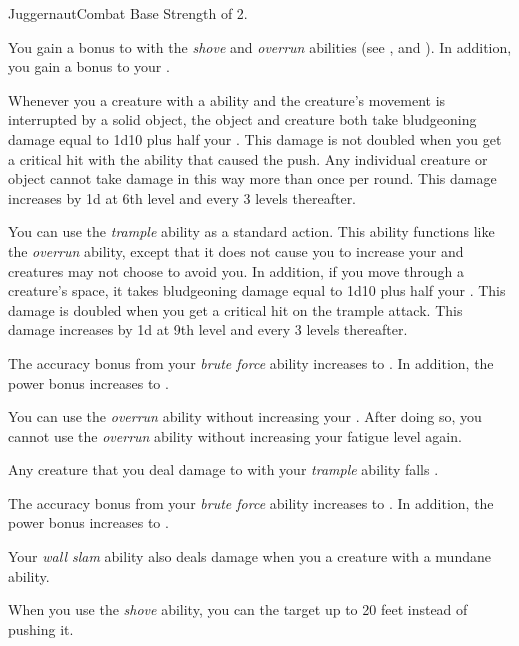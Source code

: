     \begin{feat}{Juggernaut}{Combat}
        \featpre Base Strength of 2.

         You gain a  bonus to  with the \textit{shove} and \textit{overrun} abilities (see , and ).
        In addition, you gain a  bonus to your  .

         Whenever you  a creature with a  ability and the creature's movement is interrupted by a solid object, the object and creature both take bludgeoning damage equal to 1d10 plus half your .
        This damage is not doubled when you get a critical hit with the ability that caused the push.
        Any individual creature or object cannot take damage in this way more than once per round.
        This damage increases by \plus1d at 6th level and every 3 levels thereafter.

         You can use the \textit{trample} ability as a standard action.
        This ability functions like the \textit{overrun} ability, except that it does not cause you to increase your  and creatures may not choose to avoid you.
        In addition, if you move through a creature's space, it takes bludgeoning damage equal to 1d10 plus half your .
        This damage is doubled when you get a critical hit on the trample attack.
        This damage increases by \plus1d at 9th level and every 3 levels thereafter.

         The accuracy bonus from your \textit{brute force} ability increases to .
        In addition, the power bonus increases to .

         You can use the \textit{overrun} ability without increasing your .
        After doing so, you  cannot use the \textit{overrun} ability without increasing your fatigue level again.

         Any creature that you deal damage to with your \textit{trample} ability falls .

         The accuracy bonus from your \textit{brute force} ability increases to .
        In addition, the power bonus increases to .

         Your \textit{wall slam} ability also deals damage when you  a creature with a mundane ability.

         When you use the \textit{shove} ability, you can  the target up to 20 feet instead of pushing it.
    \end{feat}

